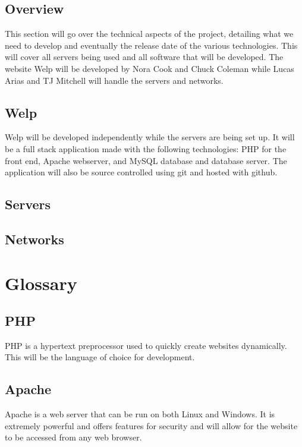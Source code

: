 \documentclass[12pt]{article}
\begin{document}
        \subsection{Overview}
                This section will go over the technical aspects of the 
                project,  detailing what we need to develop and eventually the 
                release date of the various technologies. This will cover all 
                servers being used and all software that will be developed. The 
                website Welp will be developed by Nora Cook and Chuck Coleman while
                Lucas Arias and TJ Mitchell will handle the servers and networks. 

        \subsection{Welp}
                Welp will be developed independently while the servers are
                being set up. It will be a full stack application made with the 
                following technologies: PHP for the front end, Apache webserver, 
                and MySQL database and database server. The application will also
                be source controlled using git and hosted with github. 

        \subsection{Servers}

        \subsection{Networks}

\newpage
\section{Glossary}
        \subsection{PHP}
                PHP is a hypertext preprocessor used to quickly create websites
                dynamically. This will be the language of choice for development.

        \subsection{Apache}
                Apache is a web server that can be run on both Linux and Windows.
                It is extremely powerful and offers features for security and will
                allow for the website to be accessed from any web browser.
\end{document}
